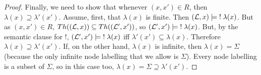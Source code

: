 \begin{proof}
Finally, we need to show that whenever $(x,x') \in R$, then $\lambda(x) \supseteq \lambda'(x')$.
Assume, first, that $\lambda(x)$ is finite. 
Then $(\mathcal{L}, x) \models \; ! \; \lambda(x)$.
But as $(x,x') \in R$, $Th((\mathcal{L}, x)) \subseteq Th((\mathcal{L}', x')) $, so  $(\mathcal{L}', x') \models \; ! \; \lambda(x)$.
But, by the semantic clause for $!$, $(\mathcal{L}', x') \models \; ! \; \lambda(x)$ iff $\lambda'(x') \subseteq \lambda(x)$.
Therefore $\lambda(x) \supseteq \lambda'(x')$.
If, on the other hand, $\lambda(x)$ is infinite, then $\lambda(x) = \Sigma$ (because the only infinite node labelling that we allow is $\Sigma$). Every node labelling is a subset of $\Sigma$, so in this case too, $\lambda(x) = \Sigma \supseteq \lambda'(x')$.


\end{proof}
